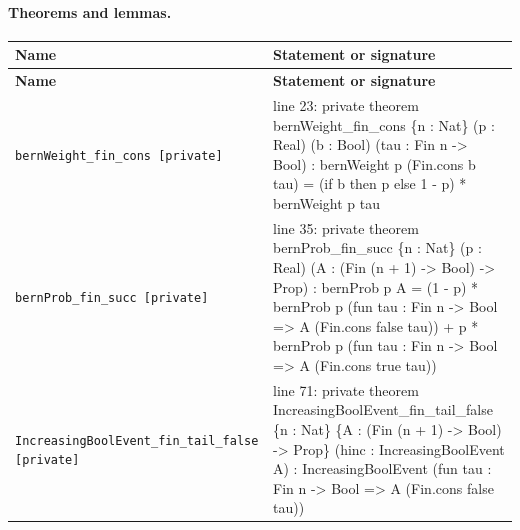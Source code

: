 \documentclass[10pt]{article}
\begin{document}
\paragraph{Theorems and lemmas.}
\begin{longtable}{>{\raggedright\arraybackslash}p{} >{\raggedright\arraybackslash}p{}}
\textbf{Name} & \textbf{Statement or signature} \\
\hline
\endfirsthead
\textbf{Name} & \textbf{Statement or signature} \\
\hline
\endhead
\texttt{bernWeight\_\allowbreak{}fin\_\allowbreak{}cons [private]} & {\ttfamily\scriptsize line 23:\allowbreak{} private theorem bernWeight\_\allowbreak{}fin\_\allowbreak{}cons \{n :\allowbreak{} Nat\} (\allowbreak{}p :\allowbreak{} Real)\allowbreak{} (\allowbreak{}b :\allowbreak{} Bool)\allowbreak{} (\allowbreak{}tau :\allowbreak{} Fin n -\allowbreak{}> Bool)\allowbreak{} :\allowbreak{} bernWeight p (\allowbreak{}Fin.\allowbreak{}cons b tau)\allowbreak{} =\allowbreak{} (\allowbreak{}if b then p else 1 -\allowbreak{} p)\allowbreak{} *\allowbreak{} bernWeight p tau} \\[0.45em]
\texttt{bernProb\_\allowbreak{}fin\_\allowbreak{}succ [private]} & {\ttfamily\scriptsize line 35:\allowbreak{} private theorem bernProb\_\allowbreak{}fin\_\allowbreak{}succ \{n :\allowbreak{} Nat\} (\allowbreak{}p :\allowbreak{} Real)\allowbreak{} (\allowbreak{}A :\allowbreak{} (\allowbreak{}Fin (\allowbreak{}n +\allowbreak{} 1)\allowbreak{} -\allowbreak{}> Bool)\allowbreak{} -\allowbreak{}> Prop)\allowbreak{} :\allowbreak{} bernProb p A =\allowbreak{} (\allowbreak{}1 -\allowbreak{} p)\allowbreak{} *\allowbreak{} bernProb p (\allowbreak{}fun tau :\allowbreak{} Fin n -\allowbreak{}> Bool =\allowbreak{}> A (\allowbreak{}Fin.\allowbreak{}cons false tau)\allowbreak{})\allowbreak{} +\allowbreak{} p *\allowbreak{} bernProb p (\allowbreak{}fun tau :\allowbreak{} Fin n -\allowbreak{}> Bool =\allowbreak{}> A (\allowbreak{}Fin.\allowbreak{}cons true tau)\allowbreak{})\allowbreak{}} \\[0.45em]
\texttt{IncreasingBoolEvent\_\allowbreak{}fin\_\allowbreak{}tail\_\allowbreak{}false [private]} & {\ttfamily\scriptsize line 71:\allowbreak{} private theorem IncreasingBoolEvent\_\allowbreak{}fin\_\allowbreak{}tail\_\allowbreak{}false \{n :\allowbreak{} Nat\} \{A :\allowbreak{} (\allowbreak{}Fin (\allowbreak{}n +\allowbreak{} 1)\allowbreak{} -\allowbreak{}> Bool)\allowbreak{} -\allowbreak{}> Prop\} (\allowbreak{}hinc :\allowbreak{} IncreasingBoolEvent A)\allowbreak{} :\allowbreak{} IncreasingBoolEvent (\allowbreak{}fun tau :\allowbreak{} Fin n -\allowbreak{}> Bool =\allowbreak{}> A (\allowbreak{}Fin.\allowbreak{}cons false tau)\allowbreak{})\allowbreak{}} \\[0.45em]

\end{longtable}
\end{document}
